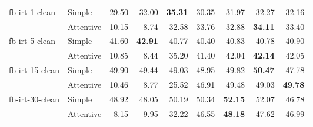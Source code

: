 \begin{tabular}{| l | l | r | r | r | r | r | r | r |}
    \multirow{2}{*}{fb-irt-1-clean}
    & Simple    & 29.50 & 32.00 & \textbf{35.31} & 30.35 & 31.97 & 32.27 & 32.16 \\
    & Attentive & 10.15 &  8.74 & 32.58 & 33.76 & 32.88 & \textbf{34.11} & 33.40 \\ \hline

    \multirow{2}{*}{fb-irt-5-clean}
    & Simple    & 41.60 & \textbf{42.91} & 40.77 & 40.40 & 40.83 & 40.78 & 40.90 \\
    & Attentive & 10.85 &  8.44 & 35.20 & 41.40 & 42.04 & \textbf{42.14} & 42.05 \\ \hline

    \multirow{2}{*}{fb-irt-15-clean}
    & Simple    & 49.90 & 49.44 & 49.03 & 48.95 & 49.82 & \textbf{50.47} & 47.78 \\
    & Attentive & 10.46 &  8.77 & 25.52 & 46.91 & 49.48 & 49.03 & \textbf{49.78} \\ \hline

    \multirow{2}{*}{fb-irt-30-clean}
    & Simple    & 48.92 & 48.05 & 50.19 & 50.34 & \textbf{52.15} & 52.07 & 46.78 \\
    & Attentive &  8.15 &  9.95 & 32.22 & 46.55 & \textbf{48.18} & 47.62 & 46.99 \\ \hline

\end{tabular}
